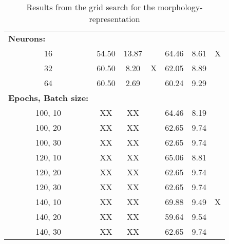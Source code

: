 \begin{table}[H]
\begin{tabular}{ccccccc}
\multicolumn{1}{l}{\textbf{Neurons:}} &  &  &  &  &  &  \\
16        		& 54.50    	& 13.87   &        & 64.46     & 8.61    & X     \\
32              & 60.50     & 8.20    & X      & 62.05     & 8.89    &       \\
64              & 60.50     & 2.69    &        & 60.24     & 9.29    &       \\ \hline
\multicolumn{1}{l}{\textbf{Epochs, Batch size:}}  &  &  &  &  &  &   \\
100, 10         & XX     & XX   &        & 64.46     & 8.19    &       \\
100, 20         & XX     & XX   &        & 62.65     & 9.74    &       \\
100, 30         & XX     & XX   &        & 62.65     & 9.74    &       \\
120, 10         & XX     & XX   &        & 65.06     & 8.81    &       \\
120, 20         & XX     & XX   &        & 62.65     & 9.74    &       \\
120, 30         & XX     & XX   &        & 62.65     & 9.74    &       \\
140, 10         & XX     & XX   &        & 69.88     & 9.49    & X     \\
140, 20         & XX     & XX   &        & 59.64     & 9.54    &       \\
140, 30         & XX     & XX   &        & 62.65     & 9.74    &       \\ \hline
\end{tabular}
\caption{Results from the grid search for the morphology-representation}
\label{tab:GridMorph}
\end{table}
\newpage

